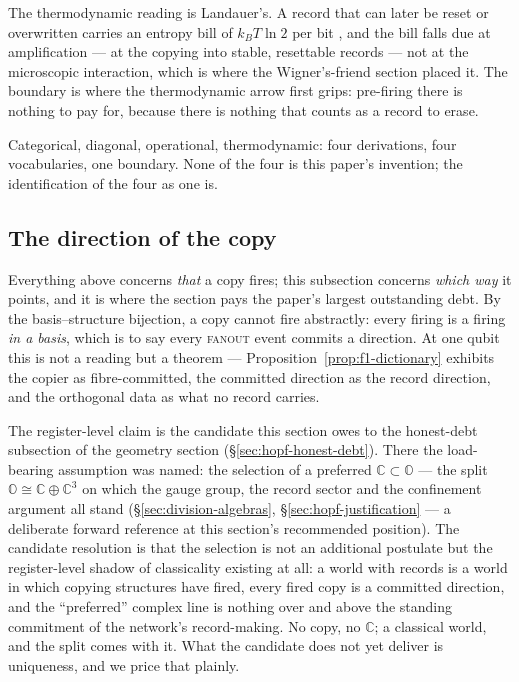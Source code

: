 The thermodynamic reading is Landauer's. A record that can later be reset or overwritten carries an
entropy bill of $k_B T \ln 2$ per bit \autocite{Landauer_1961}, and the bill falls due at
amplification --- at the copying into stable, resettable records --- not at the microscopic
interaction, which is where the Wigner's-friend section placed it. The boundary is where the
thermodynamic arrow first grips: pre-firing there is nothing to pay for, because there is nothing
that counts as a record to erase.

Categorical, diagonal, operational, thermodynamic: four derivations, four vocabularies, one
boundary. None of the four is this paper's invention; the identification of the four as one is.

\subsection{The direction of the copy}
\label{sec:fanout-direction}

Everything above concerns \emph{that} a copy fires; this subsection concerns \emph{which way} it
points, and it is where the section pays the paper's largest outstanding debt. By the
basis--structure bijection, a copy cannot fire abstractly: every firing is a firing \emph{in a
basis}, which is to say every \textsc{fanout} event commits a direction. At one qubit this is not a
reading but a theorem --- Proposition~\ref{prop:f1-dictionary} exhibits the copier as
fibre-committed, the committed direction as the record direction, and the orthogonal data as what
no record carries.

The register-level claim is the candidate this section owes to the honest-debt subsection of the
geometry section (\S\ref{sec:hopf-honest-debt}). There the load-bearing assumption was named: the
selection of a preferred $\mathbb{C} \subset \mathbb{O}$ --- the split
$\mathbb{O} \cong \mathbb{C} \oplus \mathbb{C}^{3}$ on which the gauge group, the record sector and
the confinement argument all stand (\S\ref{sec:division-algebras}, \S\ref{sec:hopf-justification}
--- a deliberate forward reference at this section's recommended position). The candidate
resolution is that the selection is not an additional postulate but the register-level shadow of
classicality existing at all: a world with records is a world in which copying structures have
fired, every fired copy is a committed direction, and the ``preferred'' complex line is nothing
over and above the standing commitment of the network's record-making. No copy, no $\mathbb{C}$; a
classical world, and the split comes with it. What the candidate does not yet deliver is
uniqueness, and we price that plainly.

